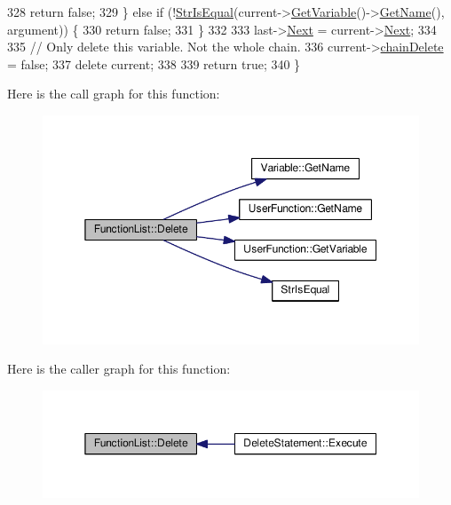 \begin{DoxyCode}
328         \textcolor{keywordflow}{return} \textcolor{keyword}{false};
329     \} \textcolor{keywordflow}{else} \textcolor{keywordflow}{if} (!\hyperlink{clib_8h_a2a1f39d11cbbaac992d42e67557dac4b}{StrIsEqual}(current->\hyperlink{classUserFunction_a4580afdaa5124951a523de07f3c454a6}{GetVariable}()->\hyperlink{classVariable_accf221d35cec8a9707e84891b715fb6c}{GetName}(), argument)) \{
330         \textcolor{keywordflow}{return} \textcolor{keyword}{false};
331     \}
332 
333     last->\hyperlink{classUserFunction_a5463f575d2ed50c0dbe069ec2841a5c9}{Next} = current->\hyperlink{classUserFunction_a5463f575d2ed50c0dbe069ec2841a5c9}{Next};
334 
335     \textcolor{comment}{// Only delete this variable. Not the whole chain.}
336     current->\hyperlink{classUserFunction_a86fecef5db791181f188bef0d7898de0}{chainDelete} = \textcolor{keyword}{false};
337     \textcolor{keyword}{delete} current;
338 
339     \textcolor{keywordflow}{return} \textcolor{keyword}{true};
340 \}
\end{DoxyCode}


Here is the call graph for this function\+:\nopagebreak
\begin{figure}[H]
\begin{center}
\leavevmode
\includegraphics[width=350pt]{classFunctionList_ae0e646a32dd118de74ab8d06f3bb775a_cgraph}
\end{center}
\end{figure}




Here is the caller graph for this function\+:\nopagebreak
\begin{figure}[H]
\begin{center}
\leavevmode
\includegraphics[width=350pt]{classFunctionList_ae0e646a32dd118de74ab8d06f3bb775a_icgraph}
\end{center}
\end{figure}


